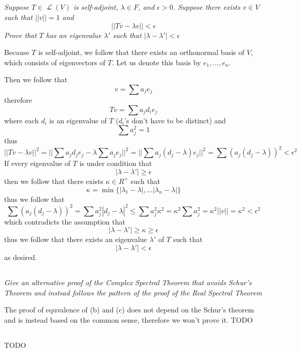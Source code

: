 \documentclass[11pt,oneside,titlepage]{book}
\DeclareMathOperator \map {\mathcal {L}}
\begin{document}
\subsection{}

\textit{Suppose $T \in \map(V)$ is self-adjoint, $\lambda \in F$, and $\epsilon > 0$. Suppose
  there exists $v \in V$ such that $||v|| = 1$ and
  $$||Tv - \lambda v|| < \epsilon$$
  Prove that $T$ has an eigenvalue $\lambda'$ such that $|\lambda - \lambda'| < \epsilon$
}

Because $T$ is self-adjoint, we follow that there exists an orthonormal basis of $V$, which
consists of eigenvectors of $T$. Let us denote this basis by $e_1, ..., e_n$.

Then we follow that
$$v = \sum a_j e_j$$
therefore
$$Tv = \sum a_j d_i e_j$$
where each $d_i$ is an eigenvalue of $T$ ($d_i$'s don't have to be distinct)
and
$$\sum a_j^2 = 1$$
thus
$$||Tv - \lambda v||^2 = ||\sum {a_j d_j e_j} - \lambda \sum{a_j e_j}||^2 =
||\sum {a_j (d_j - \lambda) e_j}||^2 = \sum{(a_j (d_j - \lambda))^2} < \epsilon^2$$
If every eigenvalue of $T$ is under condition that
$$|\lambda - \lambda'| \geq \epsilon$$
then we follow that there exists $\kappa \in R^+$ such that
$$\kappa = \min\{|\lambda_1 - \lambda|, ... |\lambda_n - \lambda|\}$$
thus we follow that 
$$\sum{(a_j (d_j - \lambda))^2} = \sum{a_j^2 |d_j - \lambda|^2} \leq
\sum{a_j^2 \kappa^2} = \kappa^2 \sum{a_j^2} = \kappa^2 ||v|| = \kappa^2 < \epsilon^2$$
which contradicts the assumption that
$$|\lambda - \lambda'| \geq \kappa  \geq \epsilon$$
thus we follow that there exists an eigenvalue $\lambda'$  of $T$ such that
$$|\lambda - \lambda'| < \epsilon$$
as desired.

\subsection{}

\textit{Give an alternative proof of the Complex Spectral Theorem that avoids Schur's Theorem
  and instead follows the pattern of the proof of the Real Spectral Theorem}

The proof of equvalence of (b) and (c) does not depend on the Schur's theorem and is instead 
based on the common sense, therefore we won't prove it. TODO

\subsection{}

TODO
\end{document}
